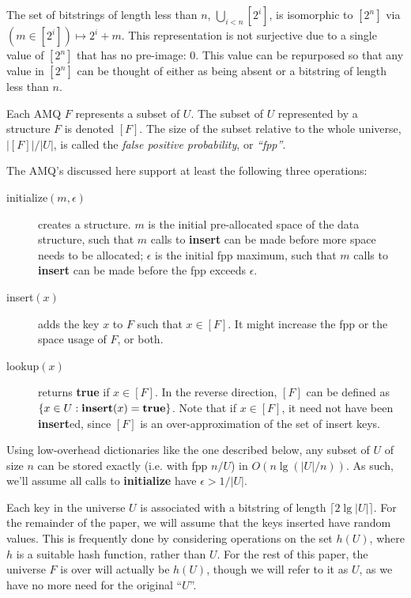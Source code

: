 \documentclass[11pt,letterpaper]{article}
\begin{document}
The set of bitstrings of length less than $n$,  $\bigcup_{i < n} [2^i]$, is isomorphic to $[2^n]$ via $(m \in [2^i]) \mapsto 2^i + m$.
This representation is not surjective due to a single value of $[2^n]$ that has no pre-image: $0$.
This value can be repurposed so that any value in $[2^n]$ can be thought of either as being absent or a bitstring of length less than $n$.

Each AMQ $F$ represents a subset of $U$.
The subset of $U$ represented by a structure $F$ is denoted $[F]$.
The size of the subset relative to the whole universe, $|[F]|/|U|$, is called the {\em false positive probability}, or {\em ``fpp''}.

The AMQ's discussed here support at least the following three operations:

\begin{description}
\item[initialize$(m, \epsilon)$] creates a structure.
  $m$ is the initial pre-allocated space of the data structure, such that $m$ calls to {\bf insert} can be made before more space needs to be allocated;
  $\epsilon$ is the initial fpp maximum, such that $m$ calls to {\bf insert} can be made before the fpp exceeds $\epsilon$.
\item[insert$(x)$] adds the key $x$ to $F$ such that $x \in [F]$.
  It might increase the fpp or the space usage of $F$, or both.
\item[lookup$(x)$] returns {\bf true} if $x \in [F]$.
  In the reverse direction, $[F]$ can be defined as $\{x \in U : {\bf insert}(x) = {\bf true}\}$.
  Note that if $x \in [F]$, it need not have been {\bf insert}ed, since $[F]$ is an over-approximation of the set of insert keys.
\end{description}

Using low-overhead dictionaries like the one described below, any subset of $U$ of size $n$ can be stored exactly (i.e. with fpp $n/U$) in $O(n \lg (|U|/n))$.
As such, we'll assume all calls to {\bf initialize} have $\epsilon > 1/|U|$.

Each key in the universe $U$ is associated with a bitstring of length $\lceil 2 \lg |U| \rceil$.
For the remainder of the paper, we will assume that the keys inserted have random values.
This is frequently done by considering operations on the set $h(U)$, where $h$ is a suitable hash function, rather than $U$.
For the rest of this paper, the universe $F$ is over will actually be $h(U)$, though we will refer to it as $U$, as we have no more need for the original ``$U$''.
\end{document}
